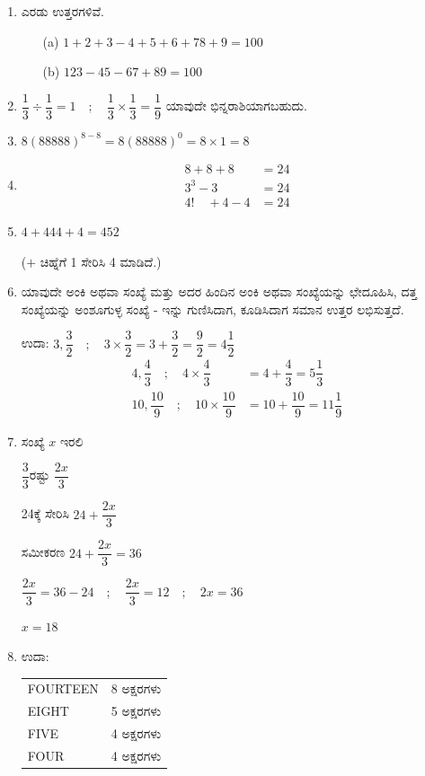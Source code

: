 \begin{enumerate}
\item ಎರಡು ಉತ್ತರಗಳಿವೆ. 
\begin{itemize}
\item[(a)] $1 + 2 + 3 - 4 + 5 + 6 +78 + 9 = 100$
\item[(b)] $123 - 45 - 67 + 89 = 100$
\end{itemize}

\item $\dfrac{1}{3} \div \dfrac{1}{3} = 1\quad;\quad \dfrac{1}{3} \times \dfrac{1}{3} = \dfrac{1}{9}$ ಯಾವುದೇ ಭಿನ್ನರಾಶಿಯಾಗಬಹುದು. 

\item $8(88888)^{8-8} = 8(88888)^{0} = 8\times 1 = 8$

\item 
\begin{align*}
8 + 8 + 8 & = 24\\
3^{3} - 3 & = 24\\
4!\quad +4 - 4 & = 24
\end{align*}

\item  $4 + 444 + 4 = 452$

($+$ ಚಿಹ್ನೆಗೆ 1 ಸೇರಿಸಿ 4 ಮಾಡಿದೆ.)

\item ಯಾವುದೇ ಅಂಕಿ ಅಥವಾ ಸಂಖ್ಯೆ ಮತ್ತು ಅದರ ಹಿಂದಿನ ಅಂಕಿ ಅಥವಾ ಸಂಖ್ಯೆಯನ್ನು ಛೇದೂಹಿಸಿ, ದತ್ತ ಸಂಖ್ಯೆಯನ್ನು ಅಂಶೂಗುಳ್ಳ ಸಂಖ್ಯೆ - ಇನ್ನು ಗುಣಿಸಿದಾಗ, ಕೂಡಿಸಿದಾಗ ಸಮಾನ ಉತ್ತರ ಲಭಿಸುತ್ತದೆ. 

ಉದಾ: $3, \dfrac{3}{2} \quad;\quad 3 \times \dfrac{3}{2} = 3 + \dfrac{3}{2} = \dfrac{9}{2} = 4\dfrac{1}{2}$
\begin{align*}
4, \dfrac{4}{3} \quad;\quad 4\times \dfrac{4}{3} & = 4 + \dfrac{4}{3} = 5\dfrac{1}{3}\\
10, \dfrac{10}{9} \quad;\quad 10\times \dfrac{10}{9} & = 10 + \dfrac{10}{9} = 11\dfrac{1}{9}
\end{align*}

\item ಸಂಖ್ಯೆ $x$ ಇರಲಿ 

$\dfrac{3}{3}$ರಷ್ಟು $\dfrac{2x}{3}$

24ಕ್ಕೆ ಸೇರಿಸಿ $24 + \dfrac{2x}{3}$

ಸಮೀಕರಣ $24 + \dfrac{2x}{3} = 36$

$\dfrac{2x}{3} = 36 - 24 \quad;\quad \dfrac{2x}{3} =12 \quad;\quad 2x = 36$

$x = 18$

\item ಉದಾ: 
\begin{tabular}[t]{ll}
FOURTEEN & 8 ಅಕ್ಷರಗಳು \\
EIGHT & 5 ಅಕ್ಷರಗಳು \\
FIVE & 4 ಅಕ್ಷರಗಳು \\
FOUR & 4 ಅಕ್ಷರಗಳು \\
\end{tabular}


\end{enumerate}

